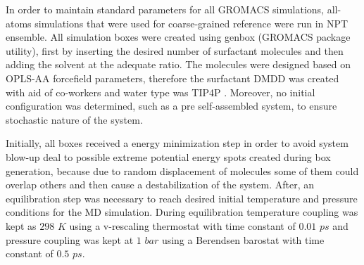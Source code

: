 \documentclass[10pt,a4paper,twoside]{article}
\begin{document}
In order to maintain standard parameters for all GROMACS simulations, all-atoms simulations that were used for coarse-grained reference were run in NPT ensemble. All simulation boxes were created using genbox (GROMACS package utility), first by inserting the desired number of surfactant molecules and then adding the solvent at the adequate ratio. The molecules were designed based on OPLS-AA forcefield \cite{opls} parameters, %
therefore the surfactant DMDD was created with aid of co-workers and water type was TIP4P \cite{tip4p}. %
Moreover, no initial configuration was determined, such as a pre self-assembled system, to ensure stochastic nature of the system.  

Initially, all boxes received a energy minimization step in order to avoid system blow-up deal to possible extreme potential energy spots created during box generation, because due to random displacement of molecules some of them could overlap others and then cause a destabilization of the system. After, an equilibration step was necessary to reach desired initial temperature and pressure conditions for the MD simulation. During equilibration temperature coupling was kept as $298$ $K$ using a v-rescaling thermostat \cite{vthermostat} with time constant of $0.01$ $ps$ and pressure coupling was kept at $1$ $bar$ using a Berendsen barostat \cite{bbarostat} with time constant of $0.5$  $ps$.
\end{document}
